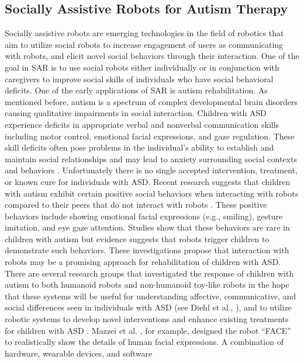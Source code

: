 \subsection{Socially Assistive Robots for Autism Therapy}
Socially assistive robots are emerging technologies in the field of robotics that aim
to utilize social robots to increase engagement of users as communicating with robots, and
elicit novel social behaviors through their interaction. One of the goal in SAR is to use
social robots either individually or in conjunction with caregivers to improve social skills
of individuals who have social behavioral deficits. One of the early applications of SAR is
autism rehabilitation. As mentioned before, autism is a spectrum of complex
developmental brain disorders causing qualitative impairments in social interaction.
Children with ASD experience deficits in appropriate verbal and nonverbal communication
skills including motor control, emotional facial expressions, and gaze regulation. These
skill deficits often pose problems in the individual’s ability to establish and maintain social
relationships and may lead to anxiety surrounding social contexts and behaviors \cite{Behavioral1964}.
Unfortunately there is no single accepted intervention, treatment, or known cure for
individuals with ASD.
Recent research suggests that children with autism exhibit certain positive social
behaviors when interacting with robots compared to their peers that do not interact with
robots \cite{RobotMovement, EnhanceEmpiri2011, DOMER2011, DefineSocial2005, SocialInteract2003}. 
These positive behaviors include showing emotional facial
expressions (e.g., smiling), gesture imitation, and eye gaze attention. Studies show that
these behaviors are rare in children with autism but evidence suggests that robots trigger
children to demonstrate such behaviors. These investigations propose that interaction with
robots may be a promising approach for rehabilitation of children with ASD.
There are several research groups that investigated the response of children with
autism to both humanoid robots and non-humanoid toy-like robots in the hope that these
systems will be useful for understanding affective, communicative, and social differences
seen in individuals with ASD (see Diehl et al., \cite{SocialInteract2003}), and to utilize robotic systems to develop
novel interventions and enhance existing treatments for children with ASD \cite{ASIMO2011, DSMIV2000, DoesMatter2006}.
Mazzei et al. \cite{ToInteract2004}, for example, designed the robot “FACE” to realistically show the details
of human facial expressions. A combination of hardware, wearable devices, and software
